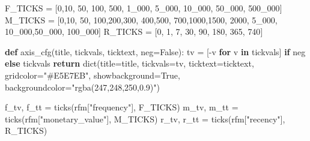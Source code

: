 \documentclass[
]{ctexart}
\newenvironment{Shaded}{\begin{snugshade}}{\end{snugshade}}
\newcommand{\BuiltInTok}[1]{\textcolor[rgb]{0.00,0.23,0.31}{#1}}
\newcommand{\ControlFlowTok}[1]{\textcolor[rgb]{0.00,0.23,0.31}{\textbf{#1}}}
\newcommand{\DecValTok}[1]{\textcolor[rgb]{0.68,0.00,0.00}{#1}}
\newcommand{\KeywordTok}[1]{\textcolor[rgb]{0.00,0.23,0.31}{\textbf{#1}}}
\newcommand{\NormalTok}[1]{\textcolor[rgb]{0.00,0.23,0.31}{#1}}
\newcommand{\OperatorTok}[1]{\textcolor[rgb]{0.37,0.37,0.37}{#1}}
\newcommand{\StringTok}[1]{\textcolor[rgb]{0.13,0.47,0.30}{#1}}
\newcommand{\VariableTok}[1]{\textcolor[rgb]{0.07,0.07,0.07}{#1}}
\begin{document}
\begin{Shaded}
\begin{Highlighting}[]
\NormalTok{F\_TICKS }\OperatorTok{=}\NormalTok{ [}\DecValTok{0}\NormalTok{,}\DecValTok{10}\NormalTok{, }\DecValTok{50}\NormalTok{, }\DecValTok{100}\NormalTok{, }\DecValTok{500}\NormalTok{, }\DecValTok{1\_000}\NormalTok{, }\DecValTok{5\_000}\NormalTok{, }\DecValTok{10\_000}\NormalTok{, }\DecValTok{50\_000}\NormalTok{, }\DecValTok{500\_000}\NormalTok{]}
\NormalTok{M\_TICKS }\OperatorTok{=}\NormalTok{ [}\DecValTok{0}\NormalTok{,}\DecValTok{10}\NormalTok{, }\DecValTok{50}\NormalTok{, }\DecValTok{100}\NormalTok{,}\DecValTok{200}\NormalTok{,}\DecValTok{300}\NormalTok{, }\DecValTok{400}\NormalTok{,}\DecValTok{500}\NormalTok{, }\DecValTok{700}\NormalTok{,}\DecValTok{1000}\NormalTok{,}\DecValTok{1500}\NormalTok{, }\DecValTok{2000}\NormalTok{, }\DecValTok{5\_000}\NormalTok{, }\DecValTok{10\_000}\NormalTok{,}\DecValTok{50\_000}\NormalTok{, }\DecValTok{100\_000}\NormalTok{]}
\NormalTok{R\_TICKS }\OperatorTok{=}\NormalTok{ [}\DecValTok{0}\NormalTok{, }\DecValTok{1}\NormalTok{, }\DecValTok{7}\NormalTok{, }\DecValTok{30}\NormalTok{, }\DecValTok{90}\NormalTok{, }\DecValTok{180}\NormalTok{, }\DecValTok{365}\NormalTok{, }\DecValTok{740}\NormalTok{]}

\KeywordTok{def}\NormalTok{ axis\_cfg(title, tickvals, ticktext, neg}\OperatorTok{=}\VariableTok{False}\NormalTok{):}
\NormalTok{    tv }\OperatorTok{=}\NormalTok{ [}\OperatorTok{{-}}\NormalTok{v }\ControlFlowTok{for}\NormalTok{ v }\KeywordTok{in}\NormalTok{ tickvals] }\ControlFlowTok{if}\NormalTok{ neg }\ControlFlowTok{else}\NormalTok{ tickvals}
    \ControlFlowTok{return} \BuiltInTok{dict}\NormalTok{(title}\OperatorTok{=}\NormalTok{title, tickvals}\OperatorTok{=}\NormalTok{tv, ticktext}\OperatorTok{=}\NormalTok{ticktext,}
\NormalTok{                gridcolor}\OperatorTok{=}\StringTok{"\#E5E7EB"}\NormalTok{, showbackground}\OperatorTok{=}\VariableTok{True}\NormalTok{,}
\NormalTok{                backgroundcolor}\OperatorTok{=}\StringTok{"rgba(247,248,250,0.9)"}\NormalTok{)}

\NormalTok{f\_tv, f\_tt }\OperatorTok{=}\NormalTok{ ticks(rfm[}\StringTok{"frequency"}\NormalTok{], F\_TICKS)}
\NormalTok{m\_tv, m\_tt }\OperatorTok{=}\NormalTok{ ticks(rfm[}\StringTok{"monetary\_value"}\NormalTok{], M\_TICKS)}
\NormalTok{r\_tv, r\_tt }\OperatorTok{=}\NormalTok{ ticks(rfm[}\StringTok{"recency"}\NormalTok{], R\_TICKS)}


\end{Highlighting}
\end{Shaded}
\end{document}
